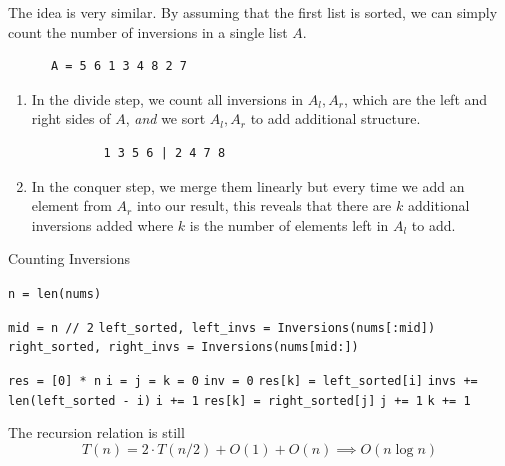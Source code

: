   \begin{algo}
    The idea is very similar. By assuming that the first list is sorted, we can simply count the number of inversions in a single list $A$.  
    \begin{lstlisting}
      A = 5 6 1 3 4 8 2 7
    \end{lstlisting}
    \begin{enumerate}
      \item In the divide step, we count all inversions in $A_l, A_r$, which are the left and right sides of $A$, \textit{and} we sort $A_l, A_r$ to add additional structure.  
        \begin{lstlisting}
          1 3 5 6 | 2 4 7 8
        \end{lstlisting}
      \item In the conquer step, we merge them linearly but every time we add an element from $A_r$ into our result, this reveals that there are $k$ additional inversions added where $k$ is the number of elements left in $A_l$ to add.  
    \end{enumerate}
    \begin{algorithm}[H]
      \caption{Counting Inversions}
      \label{alg:inversions}
      \begin{algorithmic}
          \State \texttt{n = len(nums)}

           
            \State {}
          \EndIf
          \State \texttt{mid = n // 2} 
          \State \texttt{left\_sorted, left\_invs = Inversions(nums[:mid])} 
          \State \texttt{right\_sorted, right\_invs = Inversions(nums[mid:])} 

          \State \texttt{res = [0] * n} 
          \State \texttt{i = j = k = 0} 
          \State \texttt{inv = 0} 
           
              \State \texttt{res[k] = left\_sorted[i]} 
              \State \texttt{invs += len(left\_sorted - i)} 
              \State \texttt{i += 1} 
            \Else 
              \State \texttt{res[k] = right\_sorted[j]}
              \State \texttt{j += 1}
            \EndIf 
            \State \texttt{k += 1}
          \EndWhile

          \State {}
        \EndFunction
      \end{algorithmic}
    \end{algorithm}
    The recursion relation is still 
    \begin{equation}
      T(n) = 2 \cdot T(n/2) + O(1) + O(n) \implies O(n \log{n})
    \end{equation}
  \end{algo}

